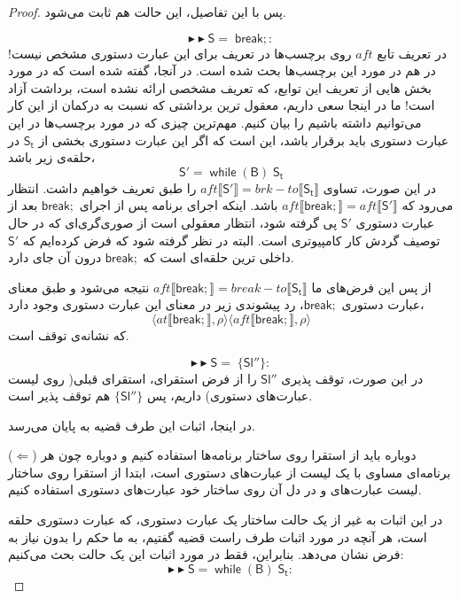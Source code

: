 \begin{proof}
پس با این تفاصیل، این حالت هم ثابت می‌شود.

$$\blacktriangleright\blacktriangleright \mathsf{S=\; break;}:$$
در تعریف تابع $aft$ روی برچسب‌ها در \cite{calcul} تعریف برای این عبارت‌ دستوری مشخص نیست! در \cite{cousotbook} هم در مورد این برچسب‌ها بحث شده است. در آنجا، گفته شده است که در مورد بخش هایی از تعریف این توابع، که تعریف مشخصی ارائه نشده است، برداشت آزاد است! ما در اینجا سعی داریم، معقول ترین برداشتی که نسبت به درکمان از این کار می‌توانیم داشته باشیم را بیان کنیم. مهم‌ترین چیزی که در مورد برچسب‌ها در این عبارت‌ دستوری باید برقرار باشد، این است که اگر این عبارت‌ دستوری بخشی از $\mathsf{S_t}$ در حلقه‌ی زیر باشد،
$$\mathsf{S'=\; while\; (B)\; S_t}$$
در این صورت، تساوی 
$aft \llbracket \mathsf{S'} \rrbracket = brk-to \llbracket \mathsf{S_t} \rrbracket $
را طبق تعریف خواهیم داشت. انتظار می‌رود که\break 
$aft \llbracket \mathsf{break;} \rrbracket = aft \llbracket \mathsf{S'} \rrbracket$ 
باشد. اینکه اجرای برنامه پس از اجرای $\mathsf{break;}$ بعد از عبارت دستوری $\mathsf{S'}$ پی گرفته شود، انتظار معقولی است از صوری‌گری‌ای که در حال توصیف گردش کار کامپیوتری است. البته در نظر گرفته شود که فرض کرده‌ایم که $\mathsf{S'}$ داخلی ترین حلقه‌ای است که $\mathsf{break;}$ درون آن جای دارد.

 از پس این فرض‌های ما 
$aft \llbracket \mathsf{break;} \rrbracket = break-to \llbracket \mathsf{S_t} \rrbracket$ 
نتیجه می‌شود و طبق معنای عبارت دستوری 
$\mathsf{break;}$،
رد پیشوندی زیر در معنای این عبارت‌ دستوری وجود دارد،
$$\langle at \llbracket \mathsf{break;} \rrbracket , \rho \rangle
\langle aft \llbracket \mathsf{break;} \rrbracket , \rho \rangle$$
 که نشانه‌ی توقف است.
 

$$\blacktriangleright\blacktriangleright \mathsf{S=\; \{ Sl'' \}}:$$
	در این صورت، توقف پذیری $\mathsf{Sl''}$ را از فرض استقرای، استقرای قبلی( روی لیست عبارت‌های دستوری) داریم، پس $\mathsf{\{Sl''\}}$ هم توقف پذیر است.
	
	
در اینجا، اثبات این طرف قضیه به پایان می‌رسد.

($\Leftarrow$)
دوباره باید از استقرا روی ساختار برنامه‌ها استفاده کنیم و دوباره چون هر برنامه‌ای مساوی با یک لیست از عبارت‌های دستوری است، ابتدا از استقرا روی ساختار لیست عبارت‌های و در دل آن روی ساختار خود عبارت‌های دستوری استفاده کنیم.

در این اثبات به غیر از یک حالت ساختار یک عبارت‌ دستوری، که عبارت‌ دستوری حلقه است، هر آنچه در مورد اثبات طرف راست قضیه گفتیم، به ما حکم را بدون نیاز به فرض نشان می‌دهد. بنابراین، فقط در مورد اثبات این یک حالت بحث می‌کنیم: 
$$\blacktriangleright\blacktriangleright \mathsf{S=\; while\; (B)\; S_t}:$$


\end{proof}
